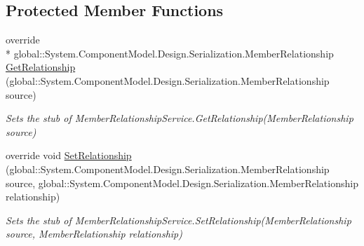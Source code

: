 \subsection*{Protected Member Functions}
\begin{DoxyCompactItemize}
\item 
override \\*
global\-::\-System.\-Component\-Model.\-Design.\-Serialization.\-Member\-Relationship \hyperlink{class_system_1_1_component_model_1_1_design_1_1_serialization_1_1_fakes_1_1_stub_member_relationship_service_a87190d8d84864b4d6a948169cd89a472}{Get\-Relationship} (global\-::\-System.\-Component\-Model.\-Design.\-Serialization.\-Member\-Relationship source)
\begin{DoxyCompactList}\small\item\em Sets the stub of Member\-Relationship\-Service.\-Get\-Relationship(\-Member\-Relationship source)\end{DoxyCompactList}\item 
override void \hyperlink{class_system_1_1_component_model_1_1_design_1_1_serialization_1_1_fakes_1_1_stub_member_relationship_service_a422c2777a28fc538e807f5bafebaf60d}{Set\-Relationship} (global\-::\-System.\-Component\-Model.\-Design.\-Serialization.\-Member\-Relationship source, global\-::\-System.\-Component\-Model.\-Design.\-Serialization.\-Member\-Relationship relationship)
\begin{DoxyCompactList}\small\item\em Sets the stub of Member\-Relationship\-Service.\-Set\-Relationship(\-Member\-Relationship source, Member\-Relationship relationship)\end{DoxyCompactList}\end{DoxyCompactItemize}
